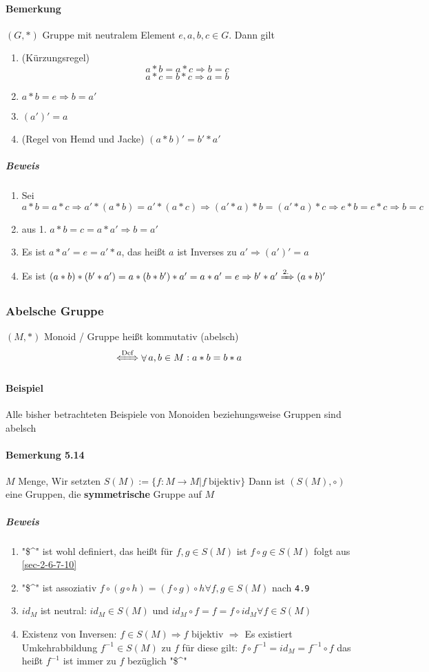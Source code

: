 \documentclass[a4paper]{scrartcl}
\DeclareMathOperator{\Forall}{\forall}
\begin{document}
\paragraph{Bemerkung}
\label{sec-3-1-4-2}
$(G,*)$ Gruppe mit neutralem Element $e,a,b,c \in G$. Dann gilt
\begin{enumerate}
\item (Kürzungsregel) \[a*b = a*c \Rightarrow b = c\] \[a*c = b * c \Rightarrow a = b\]
\item $a*b = e \Rightarrow b = a'$
\item $(a')' = a$
\item (Regel von Hemd und Jacke) $(a*b)' = b' * a'$
\end{enumerate}
\subparagraph{Beweis}
\label{sec-3-1-4-2-1}
\begin{enumerate}
\item Sei $a * b = a * c \Rightarrow a'*(a*b) = a'*(a*c) \Rightarrow (a'*a)*b=(a'*a)*c \Rightarrow e*b = e*c \Rightarrow b = c$
\item aus 1. $a*b = c = a*a' \Rightarrow b = a'$
\item Es ist $a*a' = e = a' * a$, das heißt $a$ ist Inverses zu $a' \Rightarrow (a')' = a$
\item Es ist $(a*b)*(b'*a') = a*(b*b')*a' = a*a' = e \Rightarrow b' * a' \xRightarrow{\text{2.}} (a *b)'$
\end{enumerate}
\subsubsection{Abelsche Gruppe}
\label{sec-3-1-5}
$(M,*)$ Monoid / Gruppe heißt kommutativ (abelsch)
\[\xLeftrightarrow{\text{Def}} \Forall a,b\in M: a*b = b*a\]
\paragraph{Beispiel}
\label{sec-3-1-5-1}
Alle bisher betrachteten Beispiele von Monoiden beziehungsweise Gruppen sind abelsch
\paragraph{Bemerkung 5.14}
\label{sec-3-1-5-2}
$M$ Menge, Wir setzten $S(M):= \{f:M\to M | f~\text{bijektiv}\}$
Dann ist $(S(M),\circ)$ eine Gruppen, die \textbf{symmetrische} Gruppe auf $M$
\subparagraph{Beweis}
\label{sec-3-1-5-2-1}
\begin{enumerate}
\item "\$\^{}" ist wohl definiert, das heißt für $f,g\in S(M)$ ist $f\circ g \in S(M)$ folgt aus \ref{sec-2-6-7-10}
\item "\$\^{}" ist assoziativ $f\circ(g\circ h) = (f\circ g) \circ h \Forall f,g\in S(M)$ nach \texttt{4.9}
\item $id_M$ ist neutral: $id_M \in S(M)$ und $id_M\circ f = f = f\circ id_M \Forall f\in S(M)$
\item Existenz von Inversen: $f\in S(M) \Rightarrow f$ bijektiv $\Rightarrow$ Es existiert Umkehrabbildung $f^{-1}\in S(M)$ zu $f$
         für diese gilt: $f\circ f^{-1} = id_M = f^{-1}\circ f$ das heißt $f^{-1}$ ist immer zu $f$ bezüglich "\$\^{}"
\end{enumerate}
\end{document}
